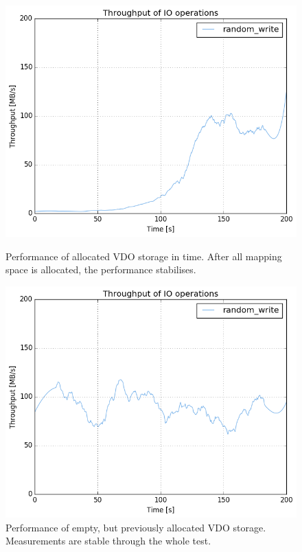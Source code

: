 \documentclass[
  color, %
  table, %
  lof,   %
  lot,   %
]{fithesis3}
\begin{document}
\clearpage
\begin{figure}[!h]
        \centering
        \includegraphics[width=\textwidth]{../results/empty_VDO/HDD/tar_467_bw}
\caption[Performance of unallocated VDO storage]{Performance of allocated VDO storage in time. After all mapping space is allocated, the performance stabilises.}
\label{fig:emptyVDO}
        \centering
        \includegraphics[width=\textwidth]{../results/empty_VDO/HDD/tar_224_bw}
\caption[Performance of allocated VDO storage]{Performance of empty, but previously allocated VDO storage. Measurements are stable through the whole test.}
\label{fig:preallocatedVDO}
\end{figure}
\end{document}
